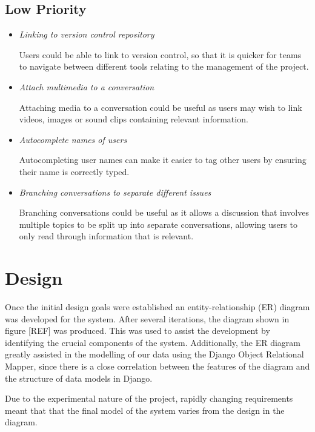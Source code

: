 \documentclass[a4paper]{l3proj}
\begin{document}
\subsection{Low Priority}
\begin{itemize}
\item \textit{Linking to version control repository} \par
Users could be able to link to version control, so that it is quicker for teams to navigate between different tools relating to the management of the project.

\item \textit{Attach multimedia to a conversation} \par
Attaching media to a conversation could be useful as users may wish to link videos, images or sound clips containing relevant information.

\item \textit{Autocomplete names of users} \par
Autocompleting user names can make it easier to tag other users by ensuring their name is correctly typed.

\item \textit{Branching conversations to separate different issues} \par
Branching conversations could be useful as it allows a discussion that involves multiple topics to be split up into separate conversations, allowing users to only read through information that is relevant.

\end{itemize}




\section{Design}
\label{design}

Once the initial design goals were established an entity-relationship (ER) diagram was developed for the system. After several iterations, the diagram shown in figure [REF] was produced. This was used to assist the development by identifying the crucial components of the system. Additionally, the ER diagram greatly assisted in the modelling of our data using the Django Object Relational Mapper, since there is a close correlation between the features of the diagram and the structure of data models in Django. 

Due to the experimental nature of the project, rapidly changing requirements meant that that the final model of the system varies from the design in the diagram.
\end{document}
